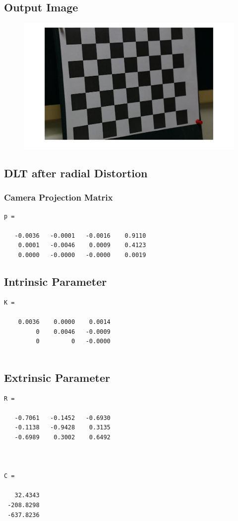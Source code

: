 \documentclass[12pt]{article}
\begin{document}
\subsection{Output Image}
\begin{figure}[htp]
\centering
\includegraphics[width=1\textwidth]{undistored.jpg}\hfill
\end{figure}
\clearpage

\subsection{DLT after radial Distortion}
\subsubsection{Camera Projection Matrix}
\begin{lstlisting}
p =

   -0.0036   -0.0001   -0.0016    0.9110
    0.0001   -0.0046    0.0009    0.4123
    0.0000   -0.0000   -0.0000    0.0019

\end{lstlisting}

\subsection{Intrinsic Parameter}
\begin{lstlisting}
K =

    0.0036    0.0000    0.0014
         0    0.0046   -0.0009
         0         0   -0.0000
         
\end{lstlisting}
\subsection{Extrinsic Parameter}
\begin{lstlisting}
R =

   -0.7061   -0.1452   -0.6930
   -0.1138   -0.9428    0.3135
   -0.6989    0.3002    0.6492



C =

   32.4343
 -208.8298
 -637.8236
 \end{lstlisting}
\end{document}
